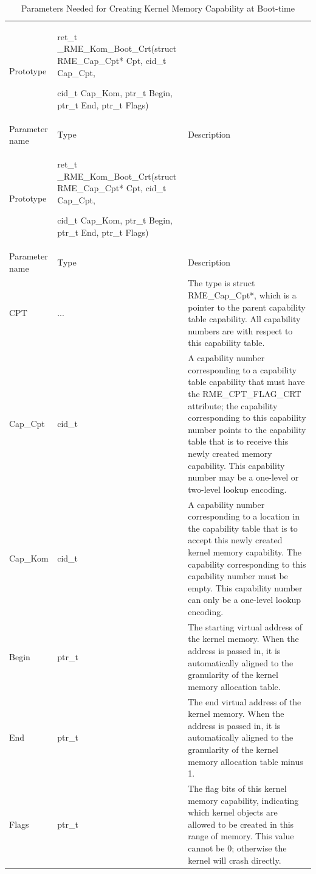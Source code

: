 \begin{xltabular}{\textwidth}{@{}>{\hsize\raggedright\arraybackslash}X>{\hsize\raggedright\arraybackslash}X>{\hsize\raggedright\arraybackslash}X@{}}
\caption{Parameters Needed for Creating Kernel Memory Capability at Boot-time}\label{tab:7-55-create-kernel-memory-capability-at-boot-parameters}\\
\toprule
Prototype\strut
 & ret\_t \_RME\_Kom\_Boot\_Crt(struct RME\_Cap\_Cpt* Cpt, cid\_t Cap\_Cpt,

cid\_t Cap\_Kom, ptr\_t Begin, ptr\_t End, ptr\_t Flags)\strut
 & \strut
\tabularnewline
Parameter name & Type & Description\tabularnewline
\endfirsthead
\toprule
Prototype\strut
 & ret\_t \_RME\_Kom\_Boot\_Crt(struct RME\_Cap\_Cpt* Cpt, cid\_t Cap\_Cpt,

cid\_t Cap\_Kom, ptr\_t Begin, ptr\_t End, ptr\_t Flags)\strut
 & \strut
\tabularnewline
Parameter name & Type & Description\tabularnewline
\midrule
\endhead
\bottomrule
\endlastfoot
CPT & ... &
The type is struct RME\_Cap\_Cpt*, which is a pointer to the parent capability table capability. All capability numbers are with respect to this capability table.\tabularnewline
Cap\_Cpt & cid\_t &
A capability number corresponding to a capability table capability that must have the RME\_CPT\_FLAG\_CRT attribute; the capability corresponding to this capability number points to the capability table that is to receive this newly created memory capability. This capability number may be a one-level or two-level lookup encoding.\tabularnewline
Cap\_Kom & cid\_t &
A capability number corresponding to a location in the capability table that is to accept this newly created kernel memory capability. The capability corresponding to this capability number must be empty. This capability number can only be a one-level lookup encoding.\tabularnewline
Begin & ptr\_t &
The starting virtual address of the kernel memory. When the address is passed in, it is automatically aligned to the granularity of the kernel memory allocation table.\tabularnewline
End & ptr\_t &
The end virtual address of the kernel memory. When the address is passed in, it is automatically aligned to the granularity of the kernel memory allocation table minus 1.\tabularnewline
Flags & ptr\_t &
The flag bits of this kernel memory capability, indicating which kernel objects are allowed to be created in this range of memory. This value cannot be 0; otherwise the kernel will crash directly.\tabularnewline
\end{xltabular}
\nopagebreak[4]

